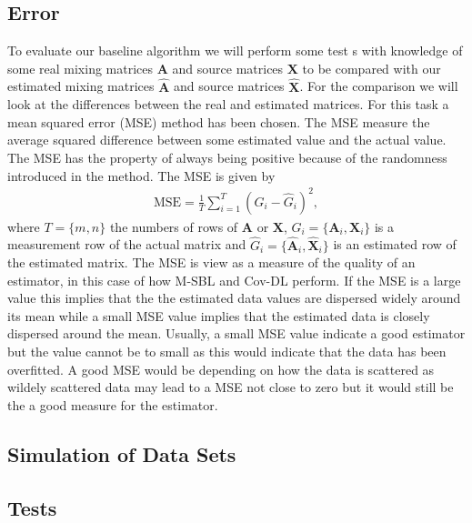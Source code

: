 \subsection{Error}
To evaluate our baseline algorithm we will perform some test s with knowledge of some real mixing matrices $\mathbf{A}$ and source matrices $\mathbf{X}$ to be compared with our estimated mixing matrices $\hat{\mathbf{A}}$ and source matrices $\hat{\mathbf{X}}$. For the comparison we will look at the differences between the real and estimated matrices. For this task a mean squared error (MSE) method has been chosen. The MSE measure the average squared difference between some estimated value and the actual value. The MSE has the property of always being positive because of the randomness introduced in the method.
The MSE is given by
\begin{align*}
\text{MSE} = \frac{1}{T} \sum_{i=1}^T (G_i - \hat{G}_i)^2,  
\end{align*}
where $T = \{m,n\}$ the numbers of rows of $\mathbf{A}$ or $\mathbf{X}$, $G_i = \{ \mathbf{A}_i, \mathbf{X}_i\}$ is a measurement row of the actual matrix and $\hat{G}_i = \{\hat{\mathbf{A}}_i,\hat{\mathbf{X}}_i\}$ is an estimated row of the estimated matrix.
The MSE is view as a measure of the quality of an estimator, in this case of how M-SBL and Cov-DL perform. 
If the MSE is a large value this implies that the the estimated data values are dispersed widely around its mean while a small MSE value implies that the estimated data is closely dispersed around the mean. Usually, a small MSE value indicate a good estimator but the value cannot be to small as this would indicate that the data has been overfitted. 
A good MSE would be depending on how the data is scattered as wildely scattered data may lead to a MSE not close to zero but it would still be the a good measure for the estimator.


\subsection{Simulation of Data Sets}

\subsection{Tests}